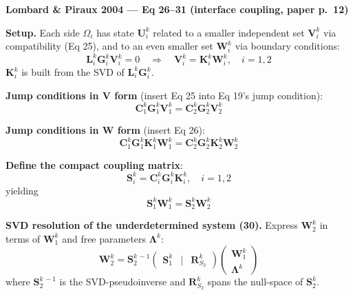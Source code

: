 \textbf{Lombard \& Piraux 2004 --- Eq 26--31 (interface coupling, paper p.\ 12)}

\medskip

\textbf{Setup.} Each side $\Omega_i$ has state $\boldsymbol{U}_i^k$
related to a smaller independent set $\boldsymbol{V}_i^k$ via compatibility
(Eq 25), and to an even smaller set $\boldsymbol{W}_i^k$ via boundary
conditions:
\begin{equation*}
  \boldsymbol{L}_i^k \boldsymbol{G}_i^k \boldsymbol{V}_i^k = 0
  \quad \Rightarrow \quad
  \boldsymbol{V}_i^k = \boldsymbol{K}_i^k \boldsymbol{W}_i^k,
  \quad i = 1, 2
  \tag{26}
\end{equation*}
$\boldsymbol{K}_i^k$ is built from the SVD of $\boldsymbol{L}_i^k \boldsymbol{G}_i^k$.

\medskip

\textbf{Jump conditions in $\boldsymbol{V}$ form} (insert Eq 25 into Eq 19's
jump condition):
\begin{equation*}
  \boldsymbol{C}_1^k \boldsymbol{G}_1^k \boldsymbol{V}_1^k
  =
  \boldsymbol{C}_2^k \boldsymbol{G}_2^k \boldsymbol{V}_2^k
  \tag{27}
\end{equation*}

\textbf{Jump conditions in $\boldsymbol{W}$ form} (insert Eq 26):
\begin{equation*}
  \boldsymbol{C}_1^k \boldsymbol{G}_1^k \boldsymbol{K}_1^k \boldsymbol{W}_1^k
  =
  \boldsymbol{C}_2^k \boldsymbol{G}_2^k \boldsymbol{K}_2^k \boldsymbol{W}_2^k
  \tag{28}
\end{equation*}

\medskip

\textbf{Define the compact coupling matrix}:
\begin{equation*}
  \boldsymbol{S}_i^k = \boldsymbol{C}_i^k \boldsymbol{G}_i^k \boldsymbol{K}_i^k,
  \quad i = 1, 2
  \tag{29}
\end{equation*}
yielding
\begin{equation*}
  \boldsymbol{S}_1^k \boldsymbol{W}_1^k
  =
  \boldsymbol{S}_2^k \boldsymbol{W}_2^k
  \tag{30}
\end{equation*}

\medskip

\textbf{SVD resolution of the underdetermined system (30).} Express
$\boldsymbol{W}_2^k$ in terms of $\boldsymbol{W}_1^k$ and free parameters
$\boldsymbol{\Lambda}^k$:
\begin{equation*}
  \boldsymbol{W}_2^k =
  \boldsymbol{S}_2^{k\,-1}
  \begin{pmatrix} \boldsymbol{S}_1^k & \big| & \boldsymbol{R}_{S_2}^k \end{pmatrix}
  \begin{pmatrix} \boldsymbol{W}_1^k \\ \boldsymbol{\Lambda}^k \end{pmatrix}
  \tag{31}
\end{equation*}
where $\boldsymbol{S}_2^{k\,-1}$ is the SVD-pseudoinverse and
$\boldsymbol{R}_{S_2}^k$ spans the null-space of
$\boldsymbol{S}_2^k$.

